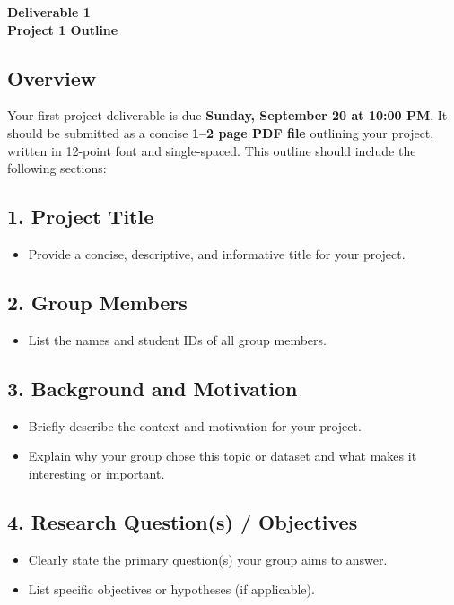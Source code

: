 \documentclass[12pt]{article}
\begin{document}
\begin{center}
\textbf{\Large Deliverable 1 \\ Project 1 Outline}
\end{center}

\subsection*{Overview}
Your first project deliverable is due \textbf{Sunday, September 20 at 10:00 PM}.
It should be submitted as a concise \textbf{1--2 page PDF file} outlining your project, written in 12-point font and single-spaced.
This outline should include the following sections:

\subsection*{1. Project Title}
\begin{itemize}
    \item Provide a concise, descriptive, and informative title for your project.
\end{itemize}

\subsection*{2. Group Members}
\begin{itemize}
    \item List the names and student IDs of all group members.
\end{itemize}

\subsection*{3. Background and Motivation}
\begin{itemize}
    \item Briefly describe the context and motivation for your project.
    \item Explain why your group chose this topic or dataset and what makes it interesting or important.
\end{itemize}

\subsection*{4. Research Question(s) / Objectives}
\begin{itemize}
    \item Clearly state the primary question(s) your group aims to answer.
    \item List specific objectives or hypotheses (if applicable).
\end{itemize}
\end{document}
